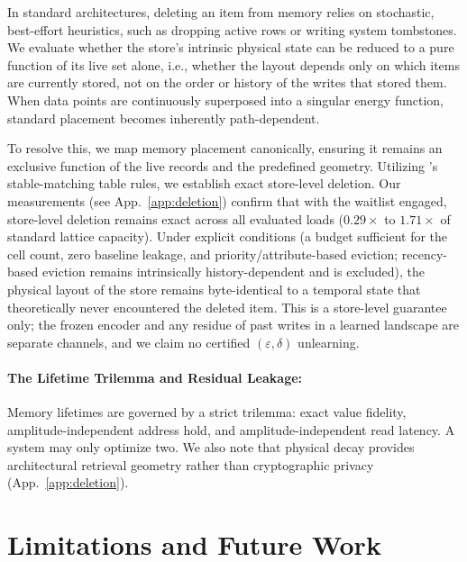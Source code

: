\documentclass{article}
\begin{document}
In standard architectures, deleting an item from memory relies on stochastic, best-effort heuristics, such as dropping active rows or writing system tombstones. We evaluate whether the store's intrinsic physical state can be reduced to a pure function of its live set alone, i.e., whether the layout depends only on which items are currently stored, not on the order or history of the writes that stored them. When data points are continuously superposed into a singular energy function, standard placement becomes inherently path-dependent.

To resolve this, we map memory placement canonically, ensuring it remains an exclusive function of the live records and the predefined geometry. Utilizing \citeauthor{blelloch_strongly_2007}'s \citeyearpar{blelloch_strongly_2007} stable-matching table rules, we establish exact store-level deletion. Our measurements (see App.~\ref{app:deletion}) confirm that with the waitlist engaged, store-level deletion remains exact across all evaluated loads ($0.29\times$ to $1.71\times$ of standard lattice capacity). Under explicit conditions (a budget sufficient for the cell count, zero baseline leakage, and priority/attribute-based eviction; recency-based eviction remains intrinsically history-dependent and is excluded), the physical layout of the store remains byte-identical to a temporal state that theoretically never encountered the deleted item. This is a store-level guarantee only; the frozen encoder and any residue of past writes in a learned landscape are separate channels, and we claim no certified $(\varepsilon,\delta)$ unlearning.

\paragraph{The Lifetime Trilemma and Residual Leakage:} Memory lifetimes are governed by a strict trilemma: exact value fidelity, amplitude-independent address hold, and amplitude-independent read latency. A system may only optimize two. We also note that physical decay provides architectural retrieval geometry rather than cryptographic privacy (App.~\ref{app:deletion}).


\section{Limitations and Future Work}\label{sec:limits}
\end{document}
